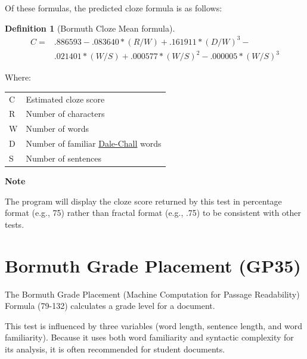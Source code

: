 \documentclass[
]{book}
\newenvironment{notesection}
    {
    \begin{tcolorbox}[colframe=mediumblue,colback=lightblue,coltext=mediumblue,arc=3mm]
    \faLightbulb[regular] \textbf{Note} \newline
    }
    {
    \end{tcolorbox}
    }
\theoremstyle{definition}
\newtheorem{definition}{Definition}[chapter]
\theoremstyle{definition}
\theoremstyle{definition}
\theoremstyle{definition}
\theoremstyle{remark}
\begin{document}
Of these formulas, the predicted cloze formula is as follows:

\begin{definition}[Bormuth Cloze Mean formula]
\protect\hypertarget{def:bormuthcloze}{}{\label{def:bormuthcloze} {} }\begin{align*}
  C = & .886593 - .083640*(R/W) + .161911*(D/W)^3 - \\
      & .021401*(W/S) + .000577*(W/S)^2 - .000005*(W/S)^3
\end{align*}
\end{definition}

Where:

\begin{longtable}[]{@{}
  >{\raggedright\arraybackslash}p{}
  >{\raggedright\arraybackslash}p{}@{}}
\toprule
\endhead
C & Estimated cloze score \\
R & Number of characters \\
W & Number of words \\
D & Number of familiar \protect\hyperlink{dale-chall-test}{Dale-Chall} words \\
S & Number of sentences \\
\bottomrule
\end{longtable}

\begin{notesection}
The program will display the cloze score returned by this test in percentage format (e.g., 75) rather than fractal format (e.g., .75) to be consistent with other tests.

\end{notesection}


\newpage

\hypertarget{bormuth-grade-placement-35-machine-passage}{%
\section{\texorpdfstring{Bormuth Grade Placement (GP35)}{Bormuth Grade Placement (GP35)}}\label{bormuth-grade-placement-35-machine-passage}}

The Bormuth Grade Placement (Machine Computation for Passage Readability) Formula (79-132) calculates a grade level for a document.

This test is influenced by three variables (word length, sentence length, and word familiarity). Because it uses both word familiarity and syntactic complexity for its analysis, it is often recommended for student documents.
\end{document}
